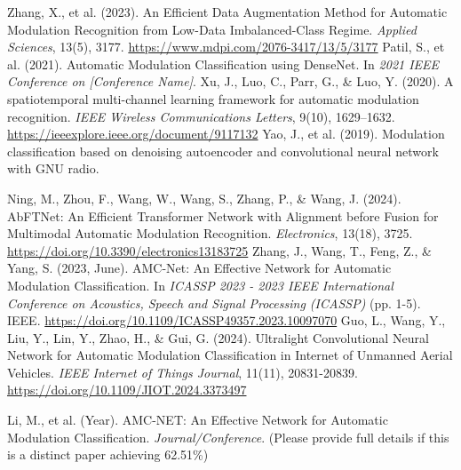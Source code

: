 \documentclass[conference]{IEEEtran}
\begin{document}
\begin{thebibliography}{00}
 Zhang, X., et al. (2023). An Efficient Data Augmentation Method for Automatic Modulation Recognition from Low-Data Imbalanced-Class Regime. \emph{Applied Sciences}, 13(5), 3177. \url{https://www.mdpi.com/2076-3417/13/5/3177}
 Patil, S., et al. (2021). Automatic Modulation Classification using DenseNet. In \emph{2021 IEEE Conference on [Conference Name]}. %
 Xu, J., Luo, C., Parr, G., \& Luo, Y. (2020). A spatiotemporal multi-channel learning framework for automatic modulation recognition. \emph{IEEE Wireless Communications Letters}, 9(10), 1629--1632. \url{https://ieeexplore.ieee.org/document/9117132}
 Yao, J., et al. (2019). Modulation classification based on denoising autoencoder and convolutional neural network with GNU radio. %

 Ning, M., Zhou, F., Wang, W., Wang, S., Zhang, P., \& Wang, J. (2024). AbFTNet: An Efficient Transformer Network with Alignment before Fusion for Multimodal Automatic Modulation Recognition. \emph{Electronics}, 13(18), 3725. \url{https://doi.org/10.3390/electronics13183725}
 Zhang, J., Wang, T., Feng, Z., \& Yang, S. (2023, June). AMC-Net: An Effective Network for Automatic Modulation Classification. In \emph{ICASSP 2023 - 2023 IEEE International Conference on Acoustics, Speech and Signal Processing (ICASSP)} (pp. 1-5). IEEE. \url{https://doi.org/10.1109/ICASSP49357.2023.10097070}
 Guo, L., Wang, Y., Liu, Y., Lin, Y., Zhao, H., \& Gui, G. (2024). Ultralight Convolutional Neural Network for Automatic Modulation Classification in Internet of Unmanned Aerial Vehicles. \emph{IEEE Internet of Things Journal}, 11(11), 20831-20839. \url{https://doi.org/10.1109/JIOT.2024.3373497}

 Li, M., et al. (Year). AMC-NET: An Effective Network for Automatic Modulation Classification. \emph{Journal/Conference}. (Please provide full details if this is a distinct paper achieving 62.51\%)



\end{thebibliography}
\end{document}
